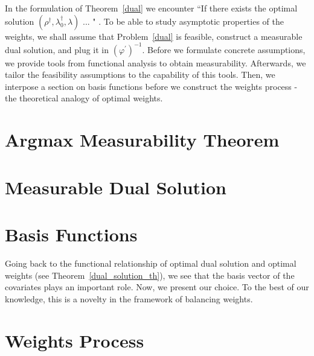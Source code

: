 In the formulation of Theorem~\ref{dual} we encounter “If there exists the optimal solution $(\rho^\dagger,\lambda_0^\dagger,\lambda)$ ... " .
To be able to study asymptotic properties of the weights, we 
shall assume that Problem~\ref{dual} is feasible,
construct a measurable dual solution, and plug it in $(\varphi^{'})^{-1}$.
Before we formulate concrete assumptions, we provide tools from functional analysis
to obtain measurability. Afterwards, we tailor the feasibility assumptions to the capability of this tools.
Then, we interpose a section on basis functions before we construct the weights process - the theoretical analogy of optimal weights.
\section{Argmax Measurability Theorem}
  
\section{Measurable Dual Solution}
  
\section{Basis Functions}
\label{sec:basis}
Going back to the functional relationship of optimal dual solution and optimal weights (see Theorem~\ref{dual_solution_th}), we see
that the basis vector of the covariates
plays an important role.
%
Now, we present our choice.
%
To the best of our knowledge, this is a novelty in the framework of balancing weights.

  
\section{Weights Process}
  
